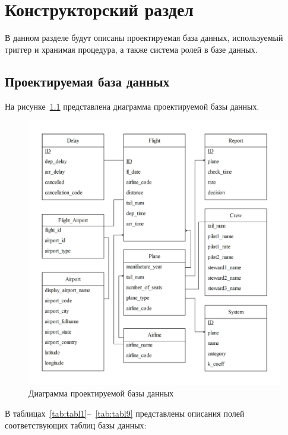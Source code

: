 \chapter{Конструкторский раздел}

В данном разделе будут описаны проектируемая база данных, используемый триггер и хранимая процедура, а также система ролей в базе данных.

\section{Проектируемая база данных}

На рисунке~\ref{fig:uml} представлена диаграмма проектируемой базы данных.
\begin{figure}[H]
    \centering
    \includegraphics[scale=0.6]{inc/Drawing3}
    \caption{Диаграмма проектируемой базы данных}
    \label{fig:uml}
\end{figure}

\newpage
В таблицах~\ref{tab:tabl1}--~\ref{tab:tabl9} представлены описания полей соответствующих таблиц базы данных:

